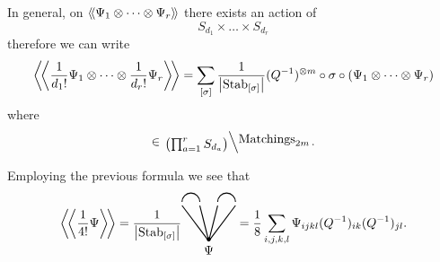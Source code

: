 In general, on $ \langle \! \langle { \Psi_1 \otimes \dots \otimes \Psi_r } \rangle \! \rangle$ there exists an action of
\begin{equation*}
  S_{d_1} \times \dots \times S_{d_r}
\end{equation*}
therefore we can write
\begin{equation*}
  \bigg \langle \! \bigg \langle {\frac{1}{d_1!} \Psi_1 \otimes \dots \otimes \frac{1}{d_r!} \Psi_r} \bigg \rangle \! \bigg \rangle
  = \sum_{[\sigma]} \frac{1}{\bigl| \operatorname{Stab}_{[\sigma]} \bigr|}
  (Q^{-1})^{\otimes m} \circ \sigma \circ (\Psi_1 \otimes \dots \otimes \Psi_r)
\end{equation*}
where
\begin{equation*}
  [\sigma] \in \lbigslant{\bigl( \prod_{a = 1}^r S_{d_a} \bigr)}{\text{Matchings}_{2m}}.
\end{equation*}

\begin{example}
  Employing the previous formula we see that
  \begin{equation*}
    \bigavg{\frac{1}{4!} \Psi} = \frac{1}{\bigl| \Stab_{[\sigma]} \bigr|}
    \begin{tikzpicture}[scale=.5, baseline=4mm]
      \draw[fill=black] (1.5, .1) circle (1mm);
      \draw[thick] (1.5, 0) node[anchor=north] {$\Psi$} -- (0, 2);
      \draw[thick] (1.5, 0) -- (1, 2);
      \draw[thick] (1.5, 0) -- (2, 2);
      \draw[thick] (1.5, 0) -- (3, 2);
      \draw[thick] (0, 2.2) arc (180:0:.5);
      \draw[thick] (2, 2.2) arc (180:0:.5);
    \end{tikzpicture}
    = \frac{1}{8} \sum_{i, j, k, l} \Psi_{ijkl} (Q^{-1})_{ik} (Q^{-1})_{jl}.
  \end{equation*}
\end{example}

